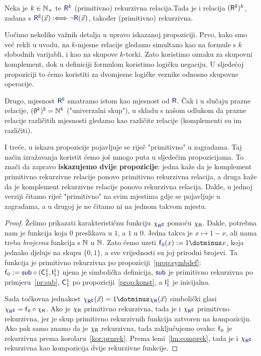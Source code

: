 \begin{propozicija}[{name=[komplement čuva (primitivnu) rekurzivnost]}]\label{prop:kompl}
Neka je $k\in{\mathbb N}_+$ te $\f R^k$ (primitivno) rekurzivna relacija.\newline Tada je i relacija $(\f R\kompl)^k$, zadana s $\f R\kompl(\vec x):\Longleftrightarrow\lnot \f R(\vec x)$, također (primitivno) rekurzivna.
\end{propozicija}

Uočimo nekoliko važnih detalja u upravo iskazanoj propoziciji. Prvo, kako smo već rekli u uvodu, na $k$-mjesne relacije gledamo simultano kao na formule s $k$ slobodnih varijabli, i kao na skupove $k$-torki. Zato koristimo oznaku za skupovni komplement, dok u definiciji formulom koristimo logičku negaciju. U sljedećoj propoziciji to ćemo koristiti za dvomjesne logičke veznike odnosno skupovne operacije.

Drugo, mjesnost  $\f R\kompl$ smatramo istom kao mjesnost od $\f R$. Čak i u slučaju prazne relacije, $(\emptyset^k)\sp{{\scriptscriptstyle\complement}}={\mathbb N}^k$ ("univerzalni skup"), u skladu s našom odlukom da prazne relacije različitih mjesnosti gledamo kao različite relacije (komplementi su im različiti).

I treće, u iskazu propozicije pojavljuje se riječ "primitivno" u zagradama. Taj način izražavanja koristit ćemo još mnogo puta u sljedećim propozicijama. To znači da zapravo \textbf{iskazujemo dvije propozicije}: jedna kaže da je komplement primitivno rekurzivne relacije ponovo primitivno rekurzivna relacija, a druga kaže da je komplement rekurzivne relacije ponovo rekurzivna relacija. Dakle, u jednoj verziji čitamo riječ "primitivno" na svim mjestima gdje se pojavljuje u zagradama, a u drugoj je ne čitamo ni na jednom takvom mjestu.

\begin{proof}
Želimo prikazati karakterističnu funkciju $\chi_{\f R\kompl}$ pomoću $\chi_{\f R}$. Dakle, potrebna nam je funkcija koja $0$ preslikava u $1$, a $1$ u $0$. Jedna takva je $x\mapsto1-x$, ali nama treba \emph{brojevna} funkcija s ${\mathbb N}$ u ${\mathbb N}$. Zato ćemo uzeti $\f f_0(x):=1\dotminus x$, koja jednako djeluje na skupu $\{0,1\}$, a sve vrijednosti su joj prirodni brojevi. Ta funkcija je primitivno rekurzivna po propoziciji~\ref{prop:symbdef}: $\f f_0:=\f{sub}\circ(\f C_1^1,\f I_1^1)$ njena je simbolička definicija, $\f{sub}$ je primitivno rekurzivna po primjeru~\ref{pr:sub}, $\f C_1^1$ po propoziciji~\ref{prop:konst}, a $\f I_1^1$ je inicijalna.

Sada točkovna jednakost $\chi_{\f R\kompl}(\vec x)=1\dotminus\chi_{\f R}(\vec x)$ simbolički glasi $\chi_{\f R\kompl}=\f f_0\circ\chi_{\f R}$. Ako je $\chi_{\f R}$ primitivno rekurzivna, tada je i $\chi_{\f R\kompl}$ primitivno rekurzivna, jer je skup primitivno rekurzivnih funkcija zatvoren na kompoziciju.
Ako pak samo znamo da je $\chi_{\f R}$ rekurzivna, tada zaključujemo ovako: $\f f_0$ je rekurzivna prema korolaru~\ref{kor:prnrek}. Prema lemi~\ref{lm:comprek}, tada je i $\chi_{\f R\kompl}$ rekurzivna kao kompozicija dvije rekurzivne funkcije.
\end{proof}

